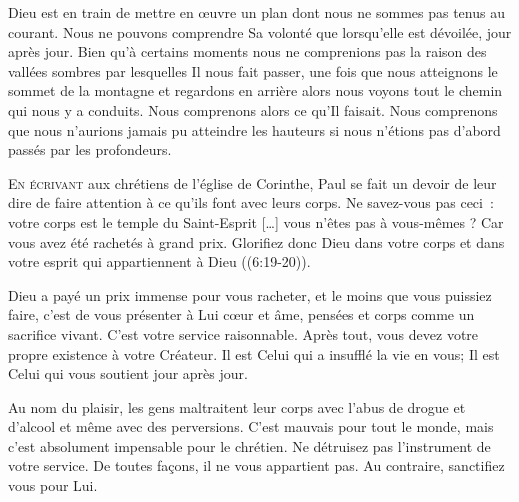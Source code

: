 Dieu est en train de mettre en \oe{}uvre un plan dont nous ne sommes
 pas tenus au courant. Nous ne pouvons comprendre Sa volonté
 que lorsqu'elle est dévoilée, jour après jour.
 Bien qu'à certains moments nous ne comprenions pas la raison
 des vallées sombres par lesquelles Il nous fait passer,
 une fois que nous atteignons le sommet de la montagne
 et regardons en arrière alors nous voyons tout le chemin
 qui nous y a conduits. Nous comprenons alors ce qu'Il faisait.
 Nous comprenons que nous n'aurions jamais pu atteindre
 les hauteurs si nous n'étions pas d'abord passés par les profondeurs.

\dvrule






\lettrine{E}{n écrivant} aux chrétiens de l'église de Corinthe,
 Paul se fait un devoir de leur dire de faire attention à ce qu'ils
 font avec leurs corps.
 \Og Ne savez-vous pas ceci~: votre corps est le temple du Saint-Esprit
 [\dots{}] vous n'êtes pas à vous-mêmes ?
 Car vous avez été rachetés à grand prix. Glorifiez donc Dieu
 dans votre corps et dans votre esprit qui appartiennent à Dieu \Fg{}
 ((6:19-20)).

Dieu a payé un prix immense pour vous racheter,
 et le moins que vous puissiez faire, c'est de vous présenter à Lui
 \ocadr c\oe{}ur et âme, pensées et corps \fcadr{} comme un sacrifice vivant.
 C'est votre service raisonnable. Après tout, vous devez votre propre
 existence à votre Créateur. Il est Celui qui a insufflé la vie en vous;
 Il est Celui qui vous soutient jour après jour.


Au nom du plaisir, les gens maltraitent leur corps avec l'abus de drogue
 et d'alcool et même avec des perversions. C'est mauvais pour tout le monde,
 mais c'est absolument impensable pour le chrétien.
 Ne détruisez pas l'instrument de votre service. De toutes fa\c{c}ons,
 il ne vous appartient pas. Au contraire, sanctifiez vous pour Lui.

